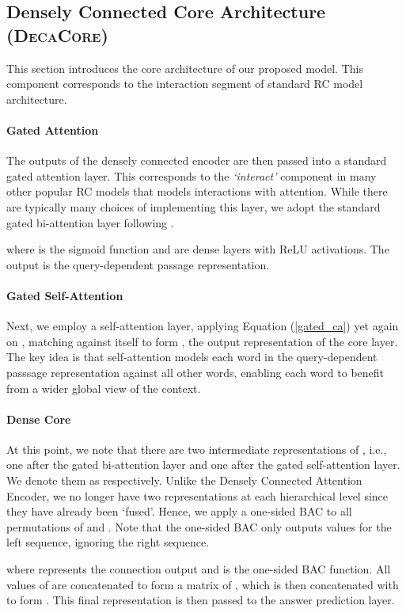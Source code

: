 \documentclass{article}
\begin{document}
\subsection{Densely Connected Core Architecture (\textsc{DecaCore})}
This section introduces the core architecture of our proposed model. This component corresponds to the interaction segment of standard RC model architecture.
\paragraph{Gated Attention} The outputs of the densely connected encoder are then passed into a standard gated attention layer. This corresponds to the \textit{`interact'} component in many other popular RC models that models  interactions with attention. While there are typically many choices of implementing this layer, we adopt the standard gated bi-attention layer following \citep{wang2017gated}.

where  is the sigmoid function and  are dense layers with ReLU activations. The output  is the query-dependent passage representation.


\paragraph{Gated Self-Attention} Next, we employ a self-attention layer, applying Equation (\ref{gated_ca}) yet again on , matching  against itself to form , the output representation of the core layer. The key idea is that self-attention models each word in the query-dependent passsage representation against all other words, enabling each
word to benefit from a wider global view of the context.


\paragraph{Dense Core} At this point, we note that there are two intermediate representations of , i.e., one after the gated bi-attention layer and one after the gated self-attention layer. We denote them as  respectively. Unlike the Densely Connected Attention Encoder, we no longer have two representations at each hierarchical level since they have already been `fused'. Hence, we apply a one-sided BAC to all permutations of  and . Note that the one-sided BAC only outputs values for the left sequence, ignoring the right sequence.

where  represents the connection output and  is the one-sided BAC function. All values of  are concatenated to form a matrix  of , which is then concatenated with  to form . This final representation is then passed to the answer prediction layer.
\end{document}
